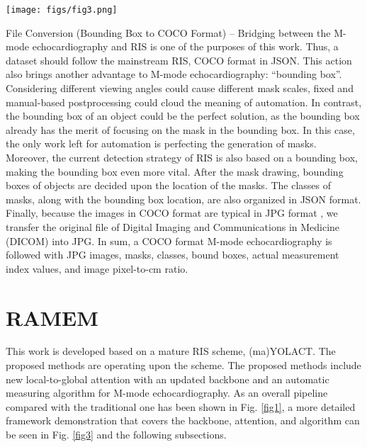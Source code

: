 \documentclass{article}
\begin{document}
\begin{figure*}[!t]
    \centering
    \texttt{[image: figs/fig3.png]}
    \caption{The Detailed of RAMEM. The proposed methods are in blue. UPANets V2 is updated with panel attention equipped with global attention ability. After going through the process from backbone to NMS, the proposed automatic algorithm, AMEM, is for measuring wanted indicators toward M-mode echocardiograms.}
    \label{fig3}
\end{figure*}

File Conversion (Bounding Box to COCO Format) – Bridging between the M-mode echocardiography and RIS is one of the purposes of this work. Thus, a dataset should follow the mainstream RIS, COCO format in JSON. This action also brings another advantage to M-mode echocardiography: “bounding box”. Considering different viewing angles could cause different mask scales, fixed and manual-based postprocessing could cloud the meaning of automation. In contrast, the bounding box of an object could be the perfect solution, as the bounding box already has the merit of focusing on the mask in the bounding box. In this case, the only work left for automation is perfecting the generation of masks. Moreover, the current detection strategy of RIS is also based on a bounding box, making the bounding box even more vital. After the mask drawing, bounding boxes of objects are decided upon the location of the masks. The classes of masks, along with the bounding box location, are also organized in JSON format. Finally, because the images in COCO format are typical in JPG format \cite{lin2014microsoft}, we transfer the original file of Digital Imaging and Communications in Medicine (DICOM) into JPG. In sum, a COCO format M-mode echocardiography is followed with JPG images, masks, classes, bound boxes, actual measurement index values, and image pixel-to-cm ratio.

\section{RAMEM}
\label{sec4}

This work is developed based on a mature RIS scheme, (ma)YOLACT. The proposed methods are operating upon the scheme. The proposed methods include new local-to-global attention with an updated backbone and an automatic measuring algorithm for M-mode echocardiography. As an overall pipeline compared with the traditional one has been shown in Fig. \ref{fig1}, a more detailed framework demonstration that covers the backbone, attention, and algorithm can be seen in Fig. \ref{fig3} and the following subsections.
\end{document}
